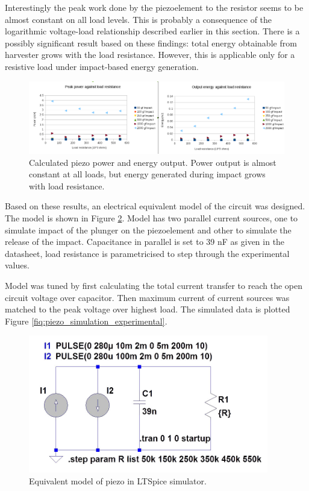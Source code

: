  Interestingly the peak work done by the piezoelement to the resistor seems to be almost constant on all load levels. This is probably a consequence of the logarithmic voltage-load relationship described earlier in this section. There is a possibly significant result based on these findings: total energy obtainable from harvester grows with the load resistance. However, this is applicable only for a resistive load under impact-based energy generation.
 
 \begin{figure}[htb]
  \begin{center}
  \includegraphics[width=\columnwidth]{images/own_measurement/piezo_power}
  \end{center}
  \caption{Calculated piezo power and energy output. Power output is almost constant at all loads, but energy generated during impact grows with load resistance.}
  \label{fig:piezo_power_energy}
\end{figure}

Based on these results, an electrical equivalent model of the circuit was designed. The model is shown in Figure \ref{fig:piezo_ltspice_equivalent}. Model has two parallel current sources, one to simulate impact of the plunger on the piezoelement and other to simulate the release of the impact. Capacitance in parallel is set to 39 nF as given in the datasheet, load resistance is parametricised to step through the experimental values.

Model was tuned by first calculating the total current transfer to reach the open circuit voltage over capacitor. Then maximum current of current sources was matched to the peak voltage over highest load.
The simulated data is plotted Figure \ref{fiq:piezo_simulation_experimental}.

 \begin{figure}[htb]
  \begin{center}
  \includegraphics[height=6cm]{images/own_dwg/ltspice_piezo}
  \end{center}
  \caption{Equivalent model of piezo in LTSpice simulator.}
  \label{fig:piezo_ltspice_equivalent}
\end{figure}

